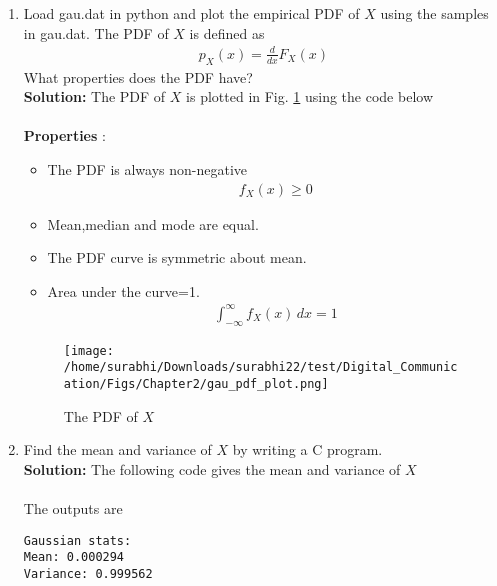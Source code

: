 \documentclass[journal,10pt,twocolumn]{IEEEtran}
\newcounter{Chapcounter}
\numberwithin{equation}{subsection}
\numberwithin{figure}{subsection}
\renewcommand\thesection{\theChapcounter.\arabic{section}}
\newcommand{\solution}{\noindent \textbf{Solution: }}
\renewcommand\thesection{\arabic{section}}
\renewcommand\thesubsection{\thesection.\arabic{subsection}}
\begin{document}
\begin{enumerate}[label=\thesubsection.\arabic*,ref=\thesubsection.\arabic{figure}]
\item
Load gau.dat in python and plot the empirical PDF of $X$ using the samples in gau.dat. The PDF of $X$ is defined as
\begin{align}
p_{X}(x) = \frac{d}{dx}F_{X}(x)
\label{eq:cdf_to_pdf}
\end{align}
What properties does the PDF have?
\\
\solution The PDF of $X$ is plotted in Fig. \ref{fig:gauss_pdf} using the code below\\

\\

\textbf{Properties} : 
\begin{itemize}
\item The PDF is always non-negative
\begin{align}
f_X(x) \ge 0
\end{align}
\item Mean,median and mode are equal.
\item The PDF curve is symmetric about mean.
\item Area under the curve=1.
\begin{align}
	\int_{-\infty}^{\infty} f_X(x) \,dx = 1
\end{align}
\end{itemize}

\begin{figure}[!ht]
\centering
\texttt{[image: /home/surabhi/Downloads/surabhi22/test/Digital\_Communication/Figs/Chapter2/gau\_pdf\_plot.png]}  
\caption{The PDF of $X$}
\label{fig:gauss_pdf}
\end{figure}

\item Find the mean and variance of $X$ by writing a C program.\\

\solution The following code gives the mean and variance of $X$\\

\\

The outputs are
\begin{lstlisting}
Gaussian stats:
Mean: 0.000294
Variance: 0.999562	
\end{lstlisting}


\end{enumerate}
\end{document}
